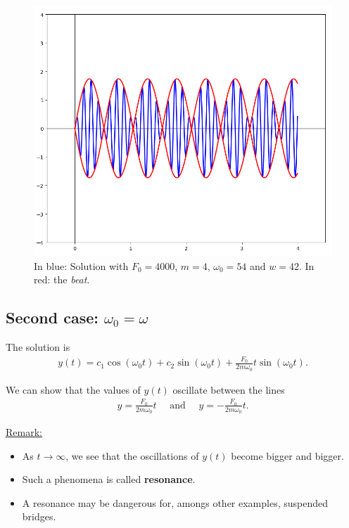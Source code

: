 \documentclass[12pt,a4paper]{article}
\newcommand{\ra}{\rightarrow}
\newcounter{example}[section]
\begin{document}
\begin{figure}
\centering
\includegraphics[scale=0.5]{fig2.png}
\caption{In blue: Solution with $F_0 = 4000$, $m = 4$, $\omega_0 = 54$ and $w = 42$. In red: the \textit{beat}.}
\end{figure}

\newpage

\subsection{Second case: $\omega_0 = \omega$}
The solution is
	\begin{align*}
	y(t) = c_1 \cos (\omega_0 t) + c_2 \sin (\omega_0 t) + \frac{F_0}{2m \omega_0} t \sin (\omega_0 t) .
	\end{align*}

We can show that the values of $y(t)$ oscillate between the lines
	\begin{align*}
	y = \frac{F_0}{2 m \omega_0} t \quad \text{ and } \quad y = - \frac{F_0}{2 m \omega_0} t .
	\end{align*}
	
\underline{Remark:}
	\begin{itemize}
	\item As $t \ra \infty$, we see that the oscillations of $y(t)$ become bigger and bigger.
	\item Such a phenomena is called \textbf{resonance}.
	\item A resonance may be dangerous for, amongs other examples, suspended bridges.
	\end{itemize}
	
\end{document}

